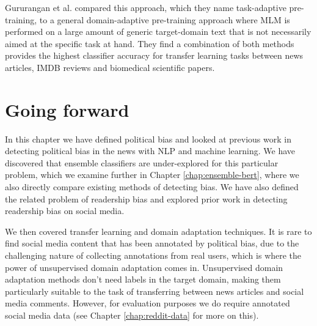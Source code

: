 Gururangan et al. \cite{dont-stop-pretraining} compared this approach, which they name task-adaptive pre-training, to a general domain-adaptive pre-training approach where MLM is performed on a large amount of generic target-domain text that is not necessarily aimed at the specific task at hand. They find a combination of both methods provides the highest classifier accuracy for transfer learning tasks between news articles, IMDB reviews and biomedical scientific papers.

\section{Going forward}

In this chapter we have defined political bias and looked at previous work in detecting political bias in the news with NLP and machine learning. We have discovered that ensemble classifiers are under-explored for this particular problem, which we examine further in Chapter \ref{chap:ensemble-bert}, where we also directly compare existing methods of detecting bias. We have also defined the related problem of readership bias and explored prior work in detecting readership bias on social media.

We then covered transfer learning and domain adaptation techniques. It is rare to find social media content that has been annotated by political bias, due to the challenging nature of collecting annotations from real users, which is where the power of unsupervised domain adaptation comes in. Unsupervised domain adaptation methods don't need labels in the target domain, making them particularly suitable to the task of transferring between news articles and social media comments. However, for evaluation purposes we do require annotated social media data (see Chapter \ref{chap:reddit-data} for more on this).